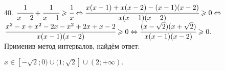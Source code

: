 40. $\cfrac{1}{x-2}+\cfrac{1}{x-1}\geqslant\cfrac{1}{x}\Leftrightarrow \cfrac{x(x-1)+x(x-2)-(x-1)(x-2)}{x(x-1)(x-2)}\geqslant0\Leftrightarrow$\\$
\cfrac{x^2-x+x^2-2x-x^2+2x+x-2}{x(x-1)(x-2)}\geqslant0\Leftrightarrow\cfrac{(x-\sqrt{2})(x+\sqrt{2})}{x(x-1)(x-2)}\geqslant0.$\\ Применив метод интервалов, найдём ответ:
\begin{figure}[ht!]
\end{figure}
$x\in[-\sqrt{2};0)\cup(1;\sqrt{2}]\cup(2;+\infty).$\\
